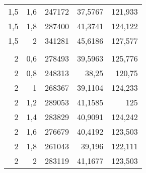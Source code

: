 \begin{table}[htbp]
\begin{tabular}{rrrrr}
    1,5   & 1,6   & 247172 & 37,5767 & 121,933 \\
    1,5   & 1,8   & 287400 & 41,3741 & 124,122 \\
    1,5   & 2     & 341281 & 45,6186 & 127,577 \\
          &       &       &       &  \\
    2     & 0,6   & 278493 & 39,5963 & 125,776 \\
    2     & 0,8   & 248313 & 38,25 & 120,75 \\
    2     & 1     & 268367 & 39,1104 & 124,233 \\
    2     & 1,2   & 289053 & 41,1585 & 125 \\
    2     & 1,4   & 283829 & 40,9091 & 124,242 \\
    2     & 1,6   & 276679 & 40,4192 & 123,503 \\
    2     & 1,8   & 261043 & 39,196 & 122,111 \\
    2     & 2     & 283119 & 41,1677 & 123,503 \\
    \bottomrule
    \end{tabular}%
  \label{tab:test3}%
\end{table}%
